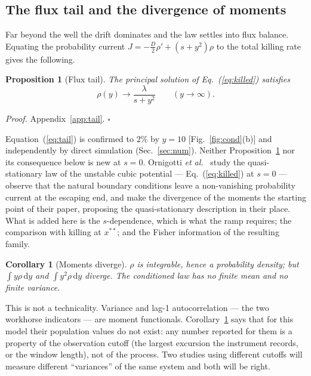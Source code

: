 \documentclass[%
 aip,
 cha,
 amsmath,amssymb,
 reprint,
 superscriptaddress,
 floatfix,
]{revtex4-2}
\newtheorem{proposition}{Proposition}
\newtheorem{corollary}{Corollary}
\newcommand{\dd}{\mathrm{d}}
\begin{document}
\subsection{The flux tail and the divergence of moments}

Far beyond the well the drift dominates and the law settles into flux balance.  Equating the probability current $J=-\tfrac D2\rho'+(s+y^2)\rho$ to the total killing rate gives the following.

\begin{proposition}[Flux tail]
\label{prop:tail}
The principal solution of Eq.~(\ref{eq:killed}) satisfies
\begin{equation}
\label{eq:tail}
\rho(y)\longrightarrow \frac{\lambda}{s+y^2}\qquad(y\to\infty).
\end{equation}
\end{proposition}

\noindent\textit{Proof.} Appendix~\ref{app:tail}. $\square$

Equation~(\ref{eq:tail}) is confirmed to $2\%$ by $y=10$ [Fig.~\ref{fig:cond}(b)] and independently by direct simulation (Sec.~\ref{sec:num}).  Neither Proposition~\ref{prop:tail} nor its consequence below is new at $s=0$.  Ornigotti \emph{et al.}~\cite{Ornigotti2018} study the quasi-stationary law of the unstable cubic potential --- Eq.~(\ref{eq:killed}) at $s=0$ --- observe that the natural boundary conditions leave a non-vanishing probability current at the escaping end, and make the divergence of the moments the starting point of their paper, proposing the quasi-stationary description in their place.  What is added here is the $s$-dependence, which is what the ramp requires; the comparison with killing at $x^{\ast\ast}$; and the Fisher information of the resulting family.

\begin{corollary}[Moments diverge]
\label{cor:moments}
$\rho$ is integrable, hence a probability density; but $\int y\rho\,\dd y$ and $\int y^2\rho\,\dd y$ diverge.  The conditioned law has no finite mean and no finite variance.
\end{corollary}

This is not a technicality.  Variance and lag-1 autocorrelation --- the two workhorse indicators --- are moment functionals.  Corollary~\ref{cor:moments} says that for this model their population values do not exist: any number reported for them is a property of the observation cutoff (the largest excursion the instrument records, or the window length), not of the process.  Two studies using different cutoffs will measure different ``variances'' of the same system and both will be right.
\end{document}
